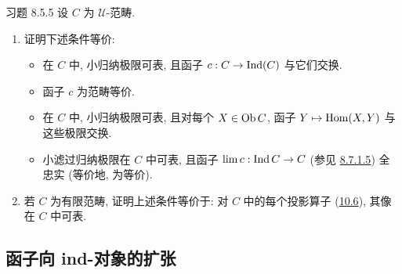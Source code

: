 \begin{enonce*}[remark]{习题 8.5.5}
设 $C$ 为 $𝒰$-范畴.
\begin{enumerate}
\renewcommand{\theenumi}{\alph{enumi}}
\renewcommand{\labelenumi}{\theenumi)}
\item 证明下述条件等价:

\begin{itemize}
\item[(i)] 在 $C$ 中, 小归纳极限可表, 且函子 $c:C\rightarrow \operatorname{Ind}(C)$ 与它们交换.

\item[(iii)] 函子 $c$ 为范畴等价.

\item[(ii)] 在 $C$ 中, 小归纳极限可表, 且对每个 $X\in \operatorname{Ob} C$,
函子 $Y\mapsto \operatorname{Hom}(X,Y)$ 与这些极限交换.

\item[(iv)] 小滤过归纳极限在 $C$ 中可表, 且函子 $\lim c:\operatorname{Ind} C\rightarrow C$
(参见 \hyperlink{sga4.exp.I.equation.8.7.1.5}{8.7.1.5}) 全忠实 (等价地, 为等价).
\end{itemize}

\item 若 $C$ 为有限范畴, 证明上述条件等价于:
对 $C$ 中的每个投影算子 (\hyperref[I.sec10.6]{10.6}), 其像在 $C$ 中可表.
\end{enumerate}
\end{enonce*}



\subsection{函子向 ind-对象的扩张}

